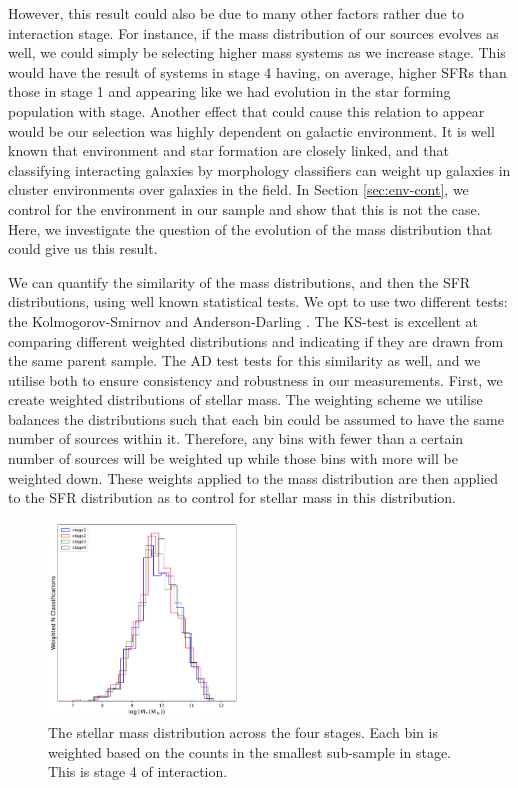 However, this result could also be due to many other factors rather due to interaction stage. For instance, if the mass distribution of our sources evolves as well, we could simply be selecting higher mass systems as we increase stage. This would have the result of systems in stage 4 having, on average, higher SFRs than those in stage 1 and appearing like we had evolution in the star forming population with stage. Another effect that could cause this relation to appear would be our selection was highly dependent on galactic environment. It is well known that environment and star formation are closely linked, and that classifying interacting galaxies by morphology classifiers can weight up galaxies in cluster environments over galaxies in the field. In Section \ref{sec:env-cont}, we control for the environment in our sample and show that this is not the case. Here, we investigate the question of the evolution of the mass distribution that could give us this result.

We can quantify the similarity of the mass distributions, and then the SFR distributions, using well known statistical tests. We opt to use two different tests: the Kolmogorov-Smirnov \citep[KS-test;][]{an1933sulla} and Anderson-Darling \citep[AD-test;][]{stephens_74}. The KS-test is excellent at comparing different weighted distributions and indicating if they are drawn from the same parent sample. The AD test tests for this similarity as well, and we utilise both to ensure consistency and robustness in our measurements. First, we create weighted distributions of stellar mass. The weighting scheme we utilise balances the distributions such that each bin could be assumed to have the same number of sources within it. Therefore, any bins with fewer than a certain number of sources will be weighted up while those bins with more will be weighted down. These weights applied to the mass distribution are then applied to the SFR distribution as to control for stellar mass in this distribution.

\begin{figure}
    \centering
    \includegraphics[width = 0.45\textwidth]{Chapter3/figures/stellar-mass-dist.pdf}
    \caption{The stellar mass distribution across the four stages. Each bin is weighted based on the counts in the smallest sub-sample in stage. This is stage 4 of interaction.}
    \label{fig:weighted-mass}
\end{figure}

